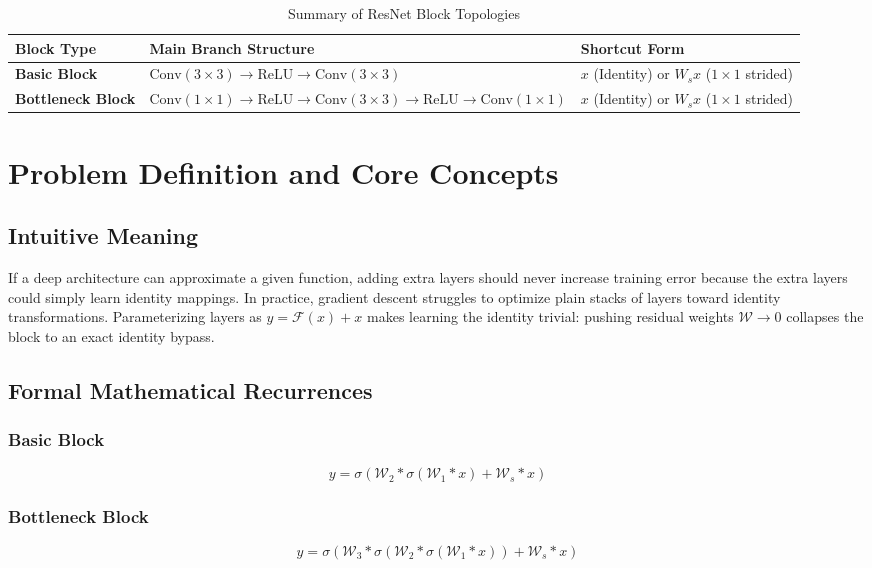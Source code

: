 \documentclass[11pt,a4paper]{article}
\theoremstyle{definition}
\begin{document}
\begin{table}[h]
\centering
\caption{Summary of ResNet Block Topologies}
\begin{tabular}{lll}
\toprule
\textbf{Block Type} & \textbf{Main Branch Structure} & \textbf{Shortcut Form} \\
\midrule
\textbf{Basic Block} & $\text{Conv}(3\times 3) \to \text{ReLU} \to \text{Conv}(3\times 3)$ & $x$ (Identity) or $W_s x$ ($1\times 1$ strided) \\
\textbf{Bottleneck Block} & $\text{Conv}(1\times 1) \to \text{ReLU} \to \text{Conv}(3\times 3) \to \text{ReLU} \to \text{Conv}(1\times 1)$ & $x$ (Identity) or $W_s x$ ($1\times 1$ strided) \\
\bottomrule
\end{tabular}
\end{table}

\section{Problem Definition and Core Concepts}

\subsection{Intuitive Meaning}
If a deep architecture can approximate a given function, adding extra layers should never increase training error because the extra layers could simply learn identity mappings. In practice, gradient descent struggles to optimize plain stacks of layers toward identity transformations. Parameterizing layers as $y = \mathcal{F}(x) + x$ makes learning the identity trivial: pushing residual weights $\mathcal{W} \to 0$ collapses the block to an exact identity bypass.

\subsection{Formal Mathematical Recurrences}

\subsubsection{Basic Block}
\begin{equation}
y = \sigma\left( \mathcal{W}_2 * \sigma(\mathcal{W}_1 * x) + \mathcal{W}_s * x \right)
\end{equation}

\subsubsection{Bottleneck Block}
\begin{equation}
y = \sigma\left( \mathcal{W}_3 * \sigma(\mathcal{W}_2 * \sigma(\mathcal{W}_1 * x)) + \mathcal{W}_s * x \right)
\end{equation}
\end{document}
